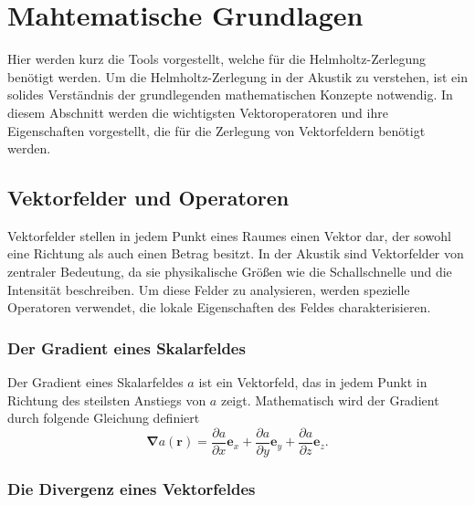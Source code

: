 %
%
%
%
\section{Mahtematische Grundlagen
\label{helmholtz:section:Mahtematische_Grundlagen}}

Hier werden kurz die Tools vorgestellt, welche für die Helmholtz-Zerlegung benötigt werden. Um die Helmholtz-Zerlegung in der Akustik zu verstehen, ist ein solides Verständnis der grundlegenden mathematischen Konzepte notwendig. In diesem Abschnitt werden die wichtigsten Vektoroperatoren und ihre Eigenschaften vorgestellt, die für die Zerlegung von Vektorfeldern benötigt werden.

\subsection{Vektorfelder und Operatoren
\label{helmholtz:subsection:Vektorfelder_Operatoren}}

Vektorfelder stellen in jedem Punkt eines Raumes einen Vektor dar, der sowohl eine Richtung als auch einen Betrag besitzt. In der Akustik sind Vektorfelder von zentraler Bedeutung, da sie physikalische Größen wie die Schallschnelle und die Intensität beschreiben. Um diese Felder zu analysieren, werden spezielle Operatoren verwendet, die lokale Eigenschaften des Feldes charakterisieren.

\subsubsection{Der Gradient eines Skalarfeldes}

Der Gradient eines Skalarfeldes $a$ ist ein Vektorfeld, das in jedem Punkt in Richtung des steilsten Anstiegs von $a$ zeigt. Mathematisch wird der Gradient durch folgende Gleichung definiert
\begin{equation}
\boldsymbol{\nabla} a (\boldsymbol{r}) = \frac{\partial a}{\partial x}\boldsymbol{e}_x + \frac{\partial a}{\partial y}\boldsymbol{e}_y + \frac{\partial a}{\partial z}\boldsymbol{e}_z.
\end{equation}



\subsubsection{Die Divergenz eines Vektorfeldes}


